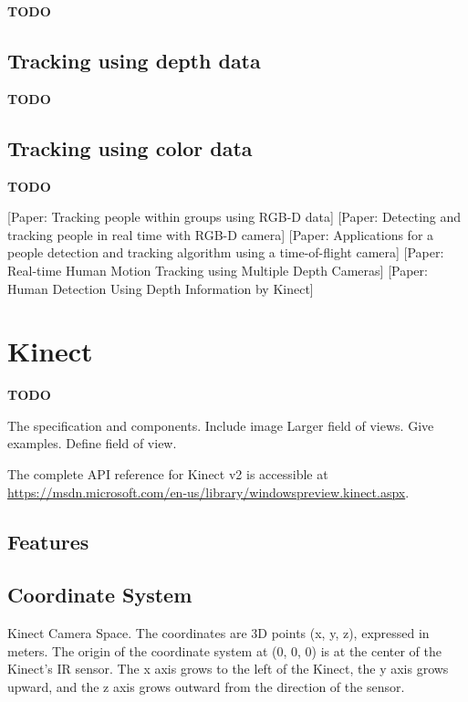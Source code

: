 \documentclass{sigchi}
\begin{document}
\textbf{TODO}

\cite{eggert_four_algorithms}
\cite{horn_unit_quaternions}

\subsection{Tracking using depth data}

\textbf{TODO}

\subsection{Tracking using color data}

\textbf{TODO}

[Paper: Tracking people within groups using RGB-D data]
[Paper: Detecting and tracking people in real time with RGB-D camera]
[Paper: Applications for a people detection and tracking algorithm using a time-of-flight camera]
[Paper: Real-time Human Motion Tracking using Multiple Depth Cameras]
[Paper: Human Detection Using Depth Information by Kinect]

\section{Kinect}
\label{sec:kinect}

\textbf{TODO}

The specification and components. Include image Larger field of views. Give examples. Define field of view.

The complete API reference for Kinect v2 is accessible at {\url{https://msdn.microsoft.com/en-us/library/windowspreview.kinect.aspx}}.

\subsection{Features}

\subsection{Coordinate System}

Kinect Camera Space. The coordinates are 3D points (x, y, z), expressed in meters. The origin of the coordinate system at (0, 0, 0) is at the center of the Kinect's IR sensor. The x axis grows to the left of the Kinect, the y axis grows upward, and the z axis grows outward from the direction of the sensor.

\cite{microsoft_kinect_coordinates}
\end{document}
